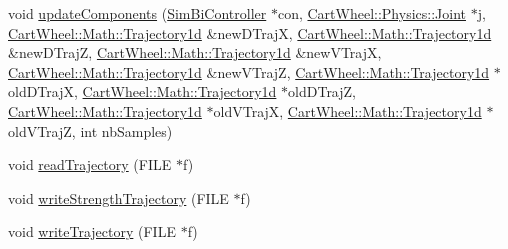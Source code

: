 \begin{DoxyCompactItemize}
\item 
void \hyperlink{classCartWheel_1_1Core_1_1Trajectory_a7b1baee227c431fca148ef37fa5f2b6e}{updateComponents} (\hyperlink{classCartWheel_1_1Core_1_1SimBiController}{SimBiController} $\ast$con, \hyperlink{classCartWheel_1_1Physics_1_1Joint}{CartWheel::Physics::Joint} $\ast$j, \hyperlink{classCartWheel_1_1Math_1_1GenericTrajectory}{CartWheel::Math::Trajectory1d} \&newDTrajX, \hyperlink{classCartWheel_1_1Math_1_1GenericTrajectory}{CartWheel::Math::Trajectory1d} \&newDTrajZ, \hyperlink{classCartWheel_1_1Math_1_1GenericTrajectory}{CartWheel::Math::Trajectory1d} \&newVTrajX, \hyperlink{classCartWheel_1_1Math_1_1GenericTrajectory}{CartWheel::Math::Trajectory1d} \&newVTrajZ, \hyperlink{classCartWheel_1_1Math_1_1GenericTrajectory}{CartWheel::Math::Trajectory1d} $\ast$oldDTrajX, \hyperlink{classCartWheel_1_1Math_1_1GenericTrajectory}{CartWheel::Math::Trajectory1d} $\ast$oldDTrajZ, \hyperlink{classCartWheel_1_1Math_1_1GenericTrajectory}{CartWheel::Math::Trajectory1d} $\ast$oldVTrajX, \hyperlink{classCartWheel_1_1Math_1_1GenericTrajectory}{CartWheel::Math::Trajectory1d} $\ast$oldVTrajZ, int nbSamples)
\item 
void \hyperlink{classCartWheel_1_1Core_1_1Trajectory_ae3f274a31efed5387bd138d7014a776c}{readTrajectory} (FILE $\ast$f)
\item 
void \hyperlink{classCartWheel_1_1Core_1_1Trajectory_a0b6041e87007f21fcad5df3cfaca9219}{writeStrengthTrajectory} (FILE $\ast$f)
\item 
void \hyperlink{classCartWheel_1_1Core_1_1Trajectory_af33cc9518a6ad9cf3b837f0a6e885f39}{writeTrajectory} (FILE $\ast$f)
\end{DoxyCompactItemize}
